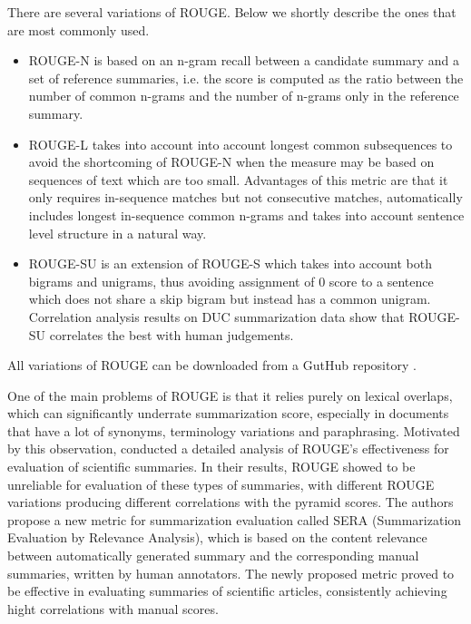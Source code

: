 \documentclass[11pt,a4paper,onecolumn]{article}
\begin{document}
There are several variations of ROUGE. Below we shortly describe the ones that are most commonly used.
\begin{itemize}
\item ROUGE-N is based on an n-gram recall between a candidate summary and a set of reference summaries, i.e. the score is computed as the ratio between the number of common n-grams and the number of n-grams only in the reference summary.
\item ROUGE-L takes into account into account longest common subsequences to avoid the shortcoming of ROUGE-N when the measure may be based on sequences of text which are too small.
Advantages of this metric are that it only requires in-sequence matches but not consecutive matches, automatically includes longest in-sequence common n-grams and takes into account sentence level structure in a natural way.
\item ROUGE-SU is an extension of ROUGE-S which takes into account both bigrams and unigrams, thus avoiding assignment of 0 score to a sentence which does not share a skip bigram but instead has a common unigram.
Correlation analysis results on DUC summarization data show that ROUGE-SU correlates the best with human judgements.
\end{itemize}
All variations of ROUGE can be downloaded from a GutHub repository \cite{rougerepos}.

One of the main problems of ROUGE is that it relies purely on lexical overlaps, which can significantly underrate summarization score, especially in documents that have a lot of synonyms, terminology variations and paraphrasing.
Motivated by this observation, \cite{cohan2016revisiting} conducted a detailed  analysis of ROUGE’s effectiveness for evaluation of scientific summaries.
In their results, ROUGE showed to be unreliable for evaluation of these types of summaries, with different ROUGE variations producing different correlations with the pyramid scores.
The authors propose a new metric for summarization evaluation called SERA (Summarization Evaluation by Relevance Analysis), which is based on the content relevance between automatically generated summary and the corresponding manual summaries, written by human annotators.
The newly proposed metric proved to be effective in evaluating summaries of scientific articles, consistently achieving hight correlations with manual scores.


%
%



\appendix
\end{document}
